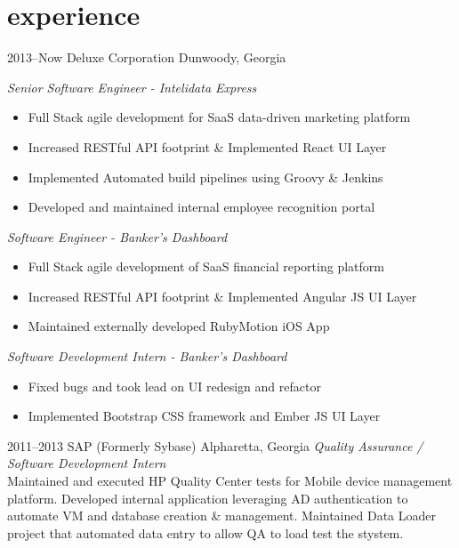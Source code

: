 \documentclass[]{friggeri-cv} %
\begin{document}
\section{experience}
\begin{entrylist}


\entry
{2013--Now}
{Deluxe Corporation}
{Dunwoody, Georgia}
{
  \emph{Senior Software Engineer - Intelidata Express}
  \begin{itemize}
    \item Full Stack agile development for SaaS data-driven marketing platform
    \item Increased RESTful API footprint \& Implemented React UI Layer
    \item Implemented Automated build pipelines using Groovy \& Jenkins
    \item Developed and maintained internal employee recognition portal
  \end{itemize}
  \emph{Software Engineer - Banker's Dashboard}
  \begin{itemize}
    \item Full Stack agile development of SaaS financial reporting platform
    \item Increased RESTful API footprint \& Implemented Angular JS UI Layer
    \item Maintained externally developed RubyMotion iOS App
  \end{itemize}
  \emph{Software Development Intern - Banker's Dashboard}
  \begin{itemize}
    \item Fixed bugs and took lead on UI redesign and refactor
    \item Implemented Bootstrap CSS framework and Ember JS UI Layer
  \end{itemize}
}
\entry
{2011--2013}
{SAP (Formerly Sybase)}
{Alpharetta, Georgia}
{\emph{Quality Assurance / Software Development Intern} \\
Maintained and executed HP Quality Center tests for Mobile device management platform.
Developed internal application leveraging AD authentication to automate VM and database creation \& management.
Maintained Data Loader project that automated data entry to allow QA to load test the stystem. }

\end{entrylist}


\end{document}
